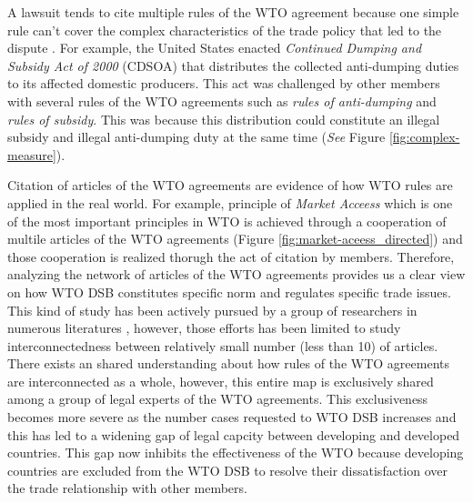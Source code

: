 A lawsuit tends to cite multiple rules of the WTO agreement because one simple rule can't cover the complex characteristics of the trade policy that led to the dispute \citep{palmeter2004dispute}.
For example, the United States enacted \textit{Continued Dumping and Subsidy Act of 2000} (CDSOA) that distributes
the collected anti-dumping duties to its affected domestic producers.
This act was challenged by other members with several rules of
the WTO agreements such as \textit{rules of anti-dumping} and \textit{rules of subsidy}. This was because
this distribution could constitute an illegal subsidy and illegal anti-dumping duty at the same time (\textit{See} Figure \ref{fig:complex-measure}).

Citation of articles of the WTO agreements are evidence of how WTO rules are applied in the real world. 
For example, principle of \textit{Market Acceess} which is one of the most important principles in WTO is achieved through a cooperation of multile articles of the WTO agreements (Figure \ref{fig:market-aceess_directed}) and those cooperation is realized thorugh the act of citation by members.
Therefore, analyzing the network of articles of the WTO agreements provides us a clear view on how WTO DSB constitutes specific norm and regulates specific trade issues. 
This kind of study has been actively pursued by a group of researchers in numerous literatures \citep{chadXXIII, charnovitz, Trachtman, who_gets}, however, those efforts has been limited to 
study interconnectedness between relatively small number (less than 10) of articles. %
There exists an shared understanding about how rules of the WTO agreements are interconnected as a whole, however, this entire map is exclusively shared among a group of legal experts of the WTO agreements.
This exclusiveness becomes more severe as the number cases requested to WTO DSB increases and this has led to a widening gap of legal capcity between developing and developed countries.
This gap now inhibits the effectiveness of the WTO because developing countries are excluded from the WTO DSB to resolve their dissatisfaction over the trade relationship with other members.



